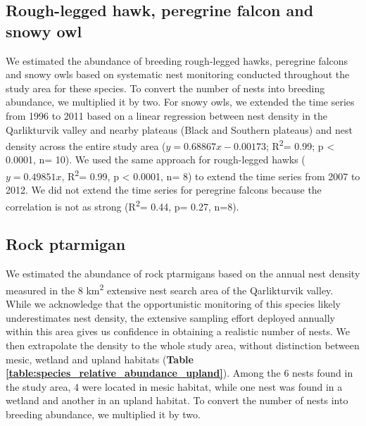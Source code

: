 \documentclass[a4paper,twoside,10pt]{article}
\begin{document}
\subsection{Rough-legged hawk, peregrine falcon and snowy owl}
We estimated the abundance of breeding rough-legged hawks, peregrine falcons and snowy owls based on systematic nest monitoring conducted throughout the study area for these species. To convert the number of nests into breeding abundance, we multiplied it by two. For snowy owls, we extended the time series from 1996 to 2011 based on a linear regression between nest density in the Qarlikturvik valley and nearby plateaus (Black and Southern plateaus) and nest density across the entire study area ($y= 0.68867x -0.00173$; R\textsuperscript{2}= 0.99; p < 0.0001, n= 10). We used the same approach for rough-legged hawks ($y=0.49851x$, R\textsuperscript{2}= 0.99, p < 0.0001, n= 8) to extend the time series from 2007 to 2012. We did not extend the time series for peregrine falcons because the correlation is not as strong (R\textsuperscript{2}= 0.44, p= 0.27, n=8).

\subsection{Rock ptarmigan}
We estimated the abundance of rock ptarmigans based on the annual nest density measured in the 8 km\textsuperscript{2} extensive nest search area of the Qarlikturvik valley. While we acknowledge that the opportunistic monitoring of this species likely underestimates nest density, the extensive sampling effort deployed annually within this area gives us confidence in obtaining a realistic number of nests. We then extrapolate the density to the whole study area, without distinction between mesic, wetland and upland habitats (\textbf{Table \ref{table:species_relative_abundance_upland}}). Among the 6 nests found in the study area, 4 were located in mesic habitat, while one nest was found in a wetland and another in an upland habitat. To convert the number of nests into breeding abundance, we multiplied it by two.
\end{document}
